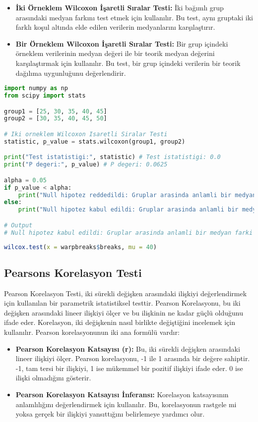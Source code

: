 \begin{itemize}
    \item \textbf{İki Örneklem Wilcoxon İşaretli Sıralar Testi:} İki bağımlı grup arasındaki medyan farkını test etmek için kullanılır. Bu test, aynı gruptaki iki farklı koşul altında elde edilen verilerin medyanlarını karşılaştırır.
    \item \textbf{Bir Örneklem Wilcoxon İşaretli Sıralar Testi:} Bir grup içindeki örneklem verilerinin medyan değeri ile bir teorik medyan değerini karşılaştırmak için kullanılır. Bu test, bir grup içindeki verilerin bir teorik dağılıma uygunluğunu değerlendirir.
\end{itemize}

\begin{lstlisting}[language=Python]
import numpy as np
from scipy import stats

group1 = [25, 30, 35, 40, 45]
group2 = [30, 35, 40, 45, 50]

# Iki orneklem Wilcoxon Isaretli Siralar Testi
statistic, p_value = stats.wilcoxon(group1, group2)

print("Test istatistigi:", statistic) # Test istatistigi: 0.0
print("P degeri:", p_value) # P degeri: 0.0625

alpha = 0.05
if p_value < alpha:
    print("Null hipotez reddedildi: Gruplar arasinda anlamli bir medyan farki vardir.")
else:
    print("Null hipotez kabul edildi: Gruplar arasinda anlamli bir medyan farki yoktur.")

# Output
# Null hipotez kabul edildi: Gruplar arasinda anlamli bir medyan farki yoktur.
\end{lstlisting}

\begin{lstlisting}[language=R]
wilcox.test(x = warpbreaks$breaks, mu = 40)
\end{lstlisting}

\subsection{Pearsons Korelasyon Testi}
Pearson Korelasyon Testi, iki sürekli değişken arasındaki ilişkiyi değerlendirmek için kullanılan bir parametrik istatistiksel testtir. Pearson Korelasyonu, bu iki değişken arasındaki lineer ilişkiyi ölçer ve bu ilişkinin ne kadar güçlü olduğunu ifade eder. Korelasyon, iki değişkenin nasıl birlikte değiştiğini incelemek için kullanılır. Pearson korelasyonunun iki ana formülü vardır:

\begin{itemize}
    \item \textbf{Pearson Korelasyon Katsayısı (r):} Bu, iki sürekli değişken arasındaki lineer ilişkiyi ölçer. Pearson korelasyonu, -1 ile 1 arasında bir değere sahiptir. -1, tam tersi bir ilişkiyi, 1 ise mükemmel bir pozitif ilişkiyi ifade eder. 0 ise ilişki olmadığını gösterir.
    \item \textbf{Pearson Korelasyon Katsayısı İnferansı:} Korelasyon katsayısının anlamlılığını değerlendirmek için kullanılır. Bu, korelasyonun rastgele mi yoksa gerçek bir ilişkiyi yansıttığını belirlemeye yardımcı olur.
\end{itemize}

